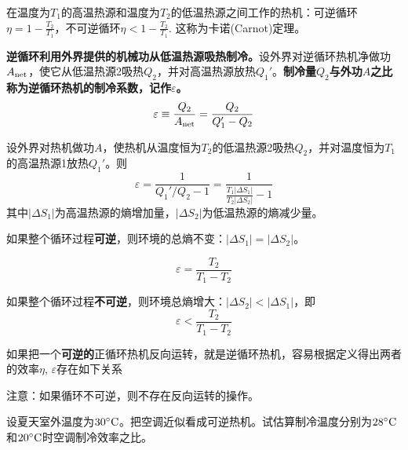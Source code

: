 \documentclass[CJK]{beamer}
\begin{document}
\begin{frame}
\bchL
{}

在温度为$T_1$的高温热源和温度为$T_2$的低温热源之间工作的热机：{\blue 可逆循环$\eta = 1 -\frac{T_2}{T_1}$，不可逆循环$\eta < 1 - \frac{T_2}{T_1}$. 这称为卡诺(Carnot)定理}。
\echL
\end{frame}

\begin{frame}
\bchL


{\bf 逆循环利用外界提供的机械功从低温热源吸热制冷。}设外界对逆循环热机净做功$A_{\rm net}$，使它从低温热源2吸热$Q_2$，并对高温热源放热$Q_1'$。{\bf 制冷量$Q_2$与外功$A$之比称为逆循环热机的制冷系数，记作$\varepsilon$。}
$$\varepsilon \equiv \frac{Q_2}{A_{\rm net}}=\frac{Q_2}{Q_1'-Q_2} $$

\echL
\end{frame}


\begin{frame}
\bch
{\small
设外界对热机做功$A$，使热机从温度恒为$T_2$的低温热源2吸热$Q_2$，并对温度恒为$T_1$的高温热源1放热$Q_1'$。则
$$\varepsilon = \frac{1}{Q_1'/Q_2 - 1} = \frac{1}{\frac{T_1|\Delta S_1|}{T_2|\Delta S_2|}-1}$$
其中$|\Delta S_1|$为高温热源的熵增加量，$|\Delta S_2|$为低温热源的熵减少量。

如果整个循环过程{\bf 可逆}，则环境的总熵不变：$|\Delta S_1| = |\Delta S_2|$。

$$ \varepsilon = \frac{T_2}{T_1-T_2}$$

如果整个循环过程{\bf 不可逆}，则环境总熵增大：$|\Delta S_2| < |\Delta S_1|$，即
$$\varepsilon <  \frac{T_2}{T_1-T_2} $$
}
\ech
\end{frame}


\begin{frame}
\bchL
如果把一个{\bf 可逆的}正循环热机反向运转，就是逆循环热机，容易根据定义得出两者的效率$\eta$, $\varepsilon$存在如下关系


注意：如果循环不可逆，则不存在反向运转的操作。
\echL
\end{frame}


\begin{frame}
\bchL


设夏天室外温度为$30^\circ \mathrm{C}$。把空调近似看成可逆热机。试估算制冷温度分别为$28^\circ \mathrm{C}$和$20^\circ \mathrm{C}$时空调制冷效率之比。

\echL
\end{frame}
\end{document}
